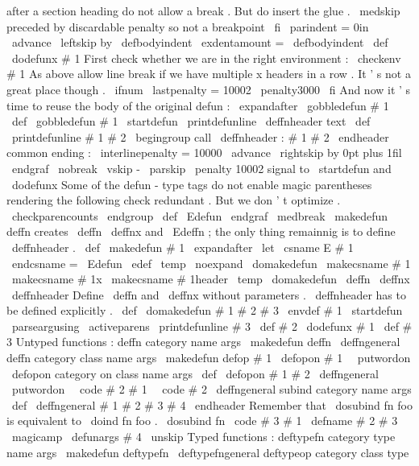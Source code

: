 {{{after
a
section
heading
do
not
allow
a
break
.
%
But
do
insert
the
glue
.
\
medskip
%
preceded
by
discardable
penalty
so
not
a
breakpoint
\
fi
%
\
parindent
=
0in
\
advance
\
leftskip
by
\
defbodyindent
\
exdentamount
=
\
defbodyindent
}
\
def
\
dodefunx
#
1
{
%
%
First
check
whether
we
are
in
the
right
environment
:
\
checkenv
#
1
%
%
%
As
above
allow
line
break
if
we
have
multiple
x
headers
in
a
row
.
%
It
'
s
not
a
great
place
though
.
\
ifnum
\
lastpenalty
=
10002
\
penalty3000
\
fi
%
%
And
now
it
'
s
time
to
reuse
the
body
of
the
original
defun
:
\
expandafter
\
gobbledefun
#
1
%
}
\
def
\
gobbledefun
#
1
\
startdefun
{
}
%
\
printdefunline
\
deffnheader
{
text
}
%
\
def
\
printdefunline
#
1
#
2
{
%
\
begingroup
%
call
\
deffnheader
:
#
1
#
2
\
endheader
%
common
ending
:
\
interlinepenalty
=
10000
\
advance
\
rightskip
by
0pt
plus
1fil
\
endgraf
\
nobreak
\
vskip
-
\
parskip
\
penalty
10002
%
signal
to
\
startdefun
and
\
dodefunx
%
Some
of
the
defun
-
type
tags
do
not
enable
magic
parentheses
%
rendering
the
following
check
redundant
.
But
we
don
'
t
optimize
.
\
checkparencounts
\
endgroup
}
\
def
\
Edefun
{
\
endgraf
\
medbreak
}
%
\
makedefun
{
deffn
}
creates
\
deffn
\
deffnx
and
\
Edeffn
;
%
the
only
thing
remainnig
is
to
define
\
deffnheader
.
%
\
def
\
makedefun
#
1
{
%
\
expandafter
\
let
\
csname
E
#
1
\
endcsname
=
\
Edefun
\
edef
\
temp
{
\
noexpand
\
domakedefun
\
makecsname
{
#
1
}
\
makecsname
{
#
1x
}
\
makecsname
{
#
1header
}
}
%
\
temp
}
%
\
domakedefun
\
deffn
\
deffnx
\
deffnheader
%
%
Define
\
deffn
and
\
deffnx
without
parameters
.
%
\
deffnheader
has
to
be
defined
explicitly
.
%
\
def
\
domakedefun
#
1
#
2
#
3
{
%
\
envdef
#
1
{
%
\
startdefun
\
parseargusing
\
activeparens
{
\
printdefunline
#
3
}
%
}
%
\
def
#
2
{
\
dodefunx
#
1
}
%
\
def
#
3
%
}
%
%
%
Untyped
functions
:
%
deffn
category
name
args
\
makedefun
{
deffn
}
{
\
deffngeneral
{
}
}
%
deffn
category
class
name
args
\
makedefun
{
defop
}
#
1
{
\
defopon
{
#
1
\
\
putwordon
}
}
%
\
defopon
{
category
on
}
class
name
args
\
def
\
defopon
#
1
#
2
{
\
deffngeneral
{
\
putwordon
\
\
code
{
#
2
}
}
{
#
1
\
\
code
{
#
2
}
}
}
%
\
deffngeneral
{
subind
}
category
name
args
%
\
def
\
deffngeneral
#
1
#
2
#
3
#
4
\
endheader
{
%
%
Remember
that
\
dosubind
{
fn
}
{
foo
}
{
}
is
equivalent
to
\
doind
{
fn
}
{
foo
}
.
\
dosubind
{
fn
}
{
\
code
{
#
3
}
}
{
#
1
}
%
\
defname
{
#
2
}
{
}
{
#
3
}
\
magicamp
\
defunargs
{
#
4
\
unskip
}
%
}
%
%
%
Typed
functions
:
%
deftypefn
category
type
name
args
\
makedefun
{
deftypefn
}
{
\
deftypefngeneral
{
}
}
%
deftypeop
category
class
type
}}
